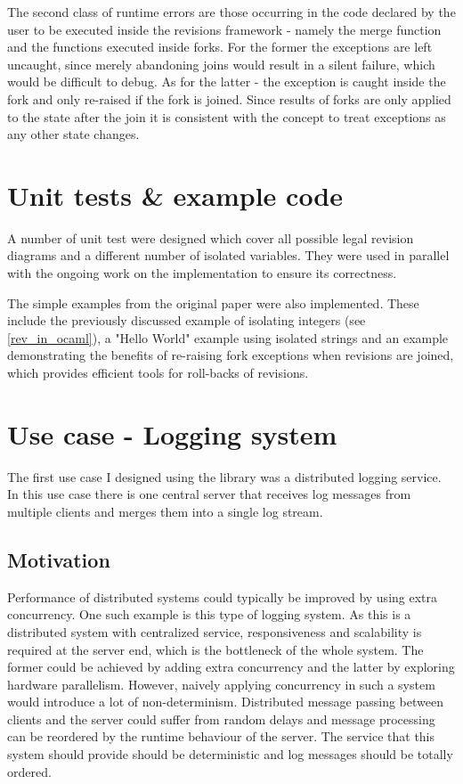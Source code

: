 \documentclass[12pt,twoside,notitlepage]{report}
\begin{document}
{{The second class of runtime errors are those occurring in the code declared by the user to be executed inside the revisions framework - namely the merge function and the functions executed inside forks. For the former the exceptions are left uncaught, since merely abandoning joins would result in a silent failure, which would be difficult to debug. As for the latter - the exception is caught inside the fork and only re-raised if the fork is joined. Since results of forks are only applied to the state after the join it is consistent with the concept to treat exceptions as any other state changes.  
 
\section{Unit tests \& example code}
 A number of unit test were designed which cover all possible legal revision diagrams and a different number of isolated variables. They were used in parallel with the ongoing work on the implementation to ensure its correctness. 
 
 The simple examples from the original paper were also implemented. These include the previously discussed example of isolating integers (see \ref{rev_in_ocaml}), a "Hello World" example using isolated strings and an example demonstrating the benefits of re-raising fork exceptions when revisions are joined, which provides efficient tools for roll-backs of revisions.
  
\section{Use case - Logging system}
\label{logging} 
The first use case I designed using the library was a distributed logging service. In this use case there is one central server that receives log messages from multiple clients and merges them into a single log stream. 

\subsection{Motivation}
Performance of distributed systems could typically be improved by using extra concurrency. One such example is this type of logging system. 
As this is a distributed system with centralized service, responsiveness and scalability is required at the server end, which is the bottleneck of the whole system. The former could be achieved by adding extra concurrency and the latter by exploring hardware parallelism. However, naively applying concurrency in such a system would introduce a lot of non-determinism. Distributed message passing between clients and the server could suffer from random delays and message processing can be reordered by the runtime behaviour of the server. The service that this system should provide should be deterministic and log messages should be totally ordered.

}}
\end{document}
